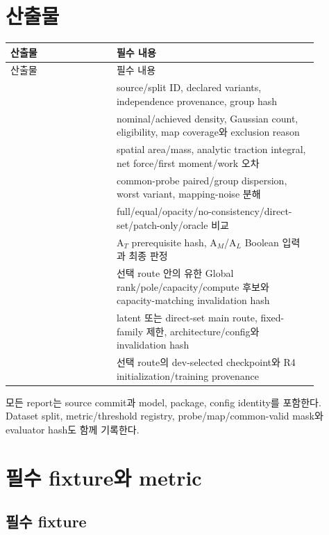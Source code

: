 \documentclass[10pt,a4paper]{article}
\begin{document}
\section{산출물}
\label{sec:r3-chapter-6}

\begin{longtable}{L{0.30\linewidth}L{0.58\linewidth}}
\toprule
산출물 & 필수 내용\\
\midrule
\endfirsthead
\toprule
산출물 & 필수 내용\\
\midrule
\endhead
{} & source/split ID, declared variants, independence provenance, group hash\\
 & nominal/achieved density, Gaussian count, eligibility, map coverage와 exclusion reason\\
 & spatial area/mass, analytic traction integral, net force/first moment/work 오차\\
 & common-probe paired/group dispersion, worst variant, mapping-noise 분해\\
 & full/equal/opacity/no-consistency/direct-set/patch-only/oracle 비교\\
 & A\(_T\) prerequisite hash, A\(_M\)/A\(_L\) Boolean 입력과 최종 판정\\
 & 선택 route 안의 유한 Global rank/pole/capacity/compute 후보와 capacity-matching invalidation hash\\
 & latent 또는 direct-set main route, fixed-family 제한, architecture/config와 invalidation hash\\
 & 선택 route의 dev-selected checkpoint와 R4 initialization/training provenance\\
\bottomrule
\end{longtable}

모든 report는 source commit과 model, package, config identity를 포함한다.
Dataset split, metric/threshold registry, probe/map/common-valid mask와 evaluator hash도 함께 기록한다.

\section{필수 fixture와 metric}
\label{sec:r3-chapter-7}

\subsection{필수 fixture}
\end{document}
